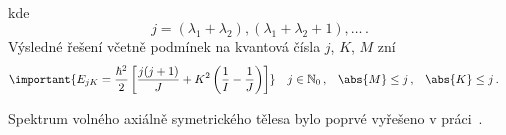\begin{solution}
\begin{enumerate}
\begin{align}
		\end{align}
		kde
		\begin{equation}
			j=(\lambda_{1}+\lambda_{2}),(\lambda_{1}+\lambda_{2}+1),\dotsc\,.
		\end{equation}
		Výsledné řešení včetně podmínek na kvantová čísla $j$, $K$, $M$ zní
		\begin{align}
			\label{eq:BodyEnergy}
			&\important{E_{jK}=\frac{\hbar^{2}}{2}\left[\frac{j(j+1)}{J}+K^{2}
				\left(\frac{1}{I}-\frac{1}{J}\right)\right]} &
			j&\in\mathbb{N}_{0}\,, & \abs{M}&\leq j\,, & \abs{K}&\leq j\,.
		\end{align}
	\end{enumerate}
				
	\begin{note}
		Spektrum volného axiálně symetrického tělesa bylo poprvé vyřešeno v práci~\cite{Kronig1927}.
	\end{note}
	

\end{solution}
